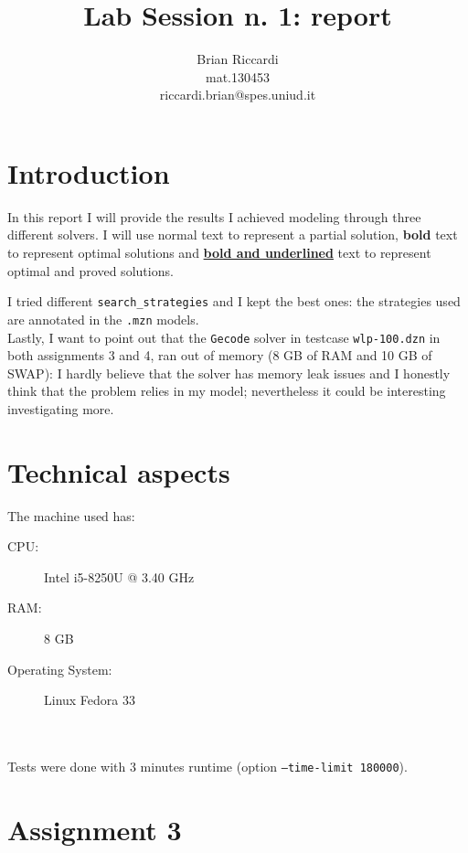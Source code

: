 \documentclass{article}
\title{Lab Session n. 1: report}
\author{Brian Riccardi \\ mat.130453 \\ riccardi.brian@spes.uniud.it}
\date{}
\newcommand{\sol}[1]{#1}
\newcommand{\opt}[1]{\textbf{#1}}
\newcommand{\proved}[1]{\textbf{\underline{#1}}}
\begin{document}
\maketitle

\section{Introduction}
In this report I will provide the results I achieved modeling through three different solvers.
I will use \sol{normal} text to represent a partial solution, \opt{bold} text to represent optimal
solutions and \proved{bold and underlined} text to represent optimal and proved solutions.

I tried different \texttt{search\_strategies} and I kept the best ones: the strategies used are annotated
in the \texttt{.mzn} models.
\ \\

Lastly, I want to point out that the \texttt{Gecode} solver in testcase \texttt{wlp-100.dzn} in both
assignments 3 and 4, ran out of memory (8 GB of RAM and 10 GB of SWAP): I hardly believe that the solver has 
memory leak issues and I honestly think that the problem relies in my model; nevertheless it could be interesting
investigating more.

\section{Technical aspects}
The machine used has:

\begin{description}
    \item[CPU:] Intel i5-8250U @ 3.40 GHz
    \item[RAM:] 8 GB
    \item[Operating System:] Linux Fedora 33
\end{description}
\ \\
\ \\
Tests were done with 3 minutes runtime (option \texttt{--time-limit 180000}).

\section{Assignment 3}
\end{document}
